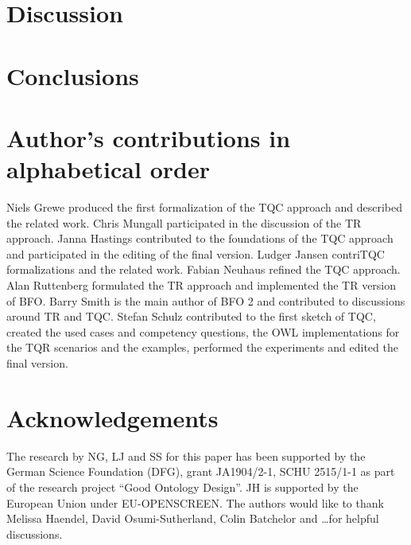\documentclass[10pt]{bmc_article}
\newenvironment{bmcformat}{\baselineskip20pt\sloppy\setboolean{publ}{false}}{\baselineskip20pt\sloppy}
\begin{document}
\begin{bmcformat}
\section*{Discussion}
\vspace{6pt}

	
\section*{Conclusions}
\vspace{6pt}


 

\bigskip

\section*{Author's contributions in alphabetical order}

Niels Grewe produced the first formalization of the TQC approach and described the related work.
Chris Mungall participated in the discussion of the TR approach. 
Janna Hastings contributed to the foundations of the TQC approach and participated in the editing of the final version.
Ludger Jansen contriTQC formalizations and the related work. 
Fabian Neuhaus refined the TQC approach. 
Alan Ruttenberg formulated the TR approach and implemented the TR version of BFO. 
Barry Smith is the main author of BFO 2 and contributed to discussions around TR and TQC. 
Stefan Schulz contributed to the first sketch of TQC, created the used cases and competency questions, the OWL implementations for the TQR scenarios
and the examples, performed the experiments and edited the final version.
 
    

\section*{Acknowledgements}
The research by NG, LJ and SS for this paper has been supported by the German
Science Foundation (DFG), grant JA1904/2-1, SCHU 2515/1-1 as part of the research project ``Good Ontology Design''.
JH is supported by the European Union under EU-OPENSCREEN. The authors would like to thank 
Melissa Haendel, David Osumi-Sutherland, Colin Batchelor and \ldots for helpful discussions.


\end{bmcformat}
\end{document}
